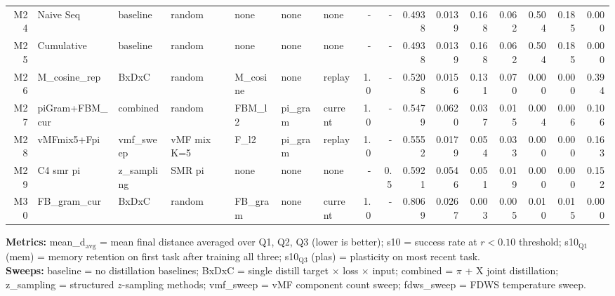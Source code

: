 \documentclass[10pt,landscape]{article}
\begin{document}
\begin{adjustbox}{max width=\textwidth}
\begin{tabular}{rl l l l l l r r rr rr rr r}
\rowcolor{baserow}
M24 & Naive Seq & baseline & random & none & none & none & - & - & 0.4938 & 0.0139 & 0.168 & 0.062 & 0.504 & 0.185 & 0.000 \\
\rowcolor{baserow}
M25 & Cumulative & baseline & random & none & none & none & - & - & 0.4938 & 0.0139 & 0.168 & 0.062 & 0.504 & 0.185 & 0.000 \\
M26 & M\_cosine\_rep & BxDxC & random & M\_cosine & none & replay & 1.0 & - & 0.5208 & 0.0156 & 0.131 & 0.070 & 0.000 & 0.000 & 0.394 \\
M27 & piGram+FBM\_cur & combined & random & FBM\_l2 & pi\_gram & current & 1.0 & - & 0.5479 & 0.0620 & 0.037 & 0.015 & 0.004 & 0.006 & 0.106 \\
M28 & vMFmix5+Fpi & vmf\_sweep & vMF mix K=5 & F\_l2 & pi\_gram & replay & 1.0 & - & 0.5552 & 0.0179 & 0.054 & 0.033 & 0.000 & 0.000 & 0.163 \\
M29 & C4 smr pi & z\_sampling & SMR pi & none & none & none & - & 0.5 & 0.5921 & 0.0546 & 0.051 & 0.019 & 0.000 & 0.000 & 0.152 \\
M30 & FB\_gram\_cur & BxDxC & random & FB\_gram & none & current & 1.0 & - & 0.8069 & 0.0267 & 0.003 & 0.005 & 0.010 & 0.015 & 0.000 \\
\bottomrule
\end{tabular}
\end{adjustbox}

\vspace{6pt}
{\footnotesize
\textbf{Metrics:} mean\_d$_\text{avg}$ = mean final distance averaged over Q1, Q2, Q3 (lower is better);
s10 = success rate at $r{<}0.10$ threshold;
s10$_\text{Q1}$ (mem) = memory retention on first task after training all three;
s10$_\text{Q3}$ (plas) = plasticity on most recent task.\\
\textbf{Sweeps:} baseline = no distillation baselines;
BxDxC = single distill target $\times$ loss $\times$ input;
combined = $\pi$ + X joint distillation;
z\_sampling = structured $z$-sampling methods;
vmf\_sweep = vMF component count sweep;
fdws\_sweep = FDWS temperature sweep.
}
\end{document}

